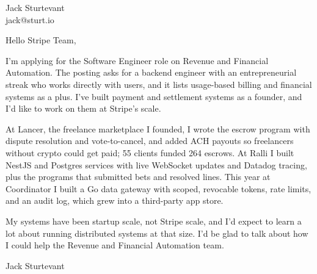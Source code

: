 \documentclass[11pt]{article}
\begin{document}
\raggedright

{\namefont\fontsize{20pt}{24pt}\selectfont Jack Sturtevant}\\[-0.3em]
jack@sturt.io

\vspace{1.2em}

Hello Stripe Team,

I'm applying for the Software Engineer role on Revenue and Financial Automation. The posting asks for a backend engineer with an entrepreneurial streak who works directly with users, and it lists usage-based billing and financial systems as a plus. I've built payment and settlement systems as a founder, and I'd like to work on them at Stripe's scale.

At Lancer, the freelance marketplace I founded, I wrote the escrow program with dispute resolution and vote-to-cancel, and added ACH payouts so freelancers without crypto could get paid; 55 clients funded 264 escrows. At Ralli I built NestJS and Postgres services with live WebSocket updates and Datadog tracing, plus the programs that submitted bets and resolved lines. This year at Coordinator I built a Go data gateway with scoped, revocable tokens, rate limits, and an audit log, which grew into a third-party app store.

My systems have been startup scale, not Stripe scale, and I'd expect to learn a lot about running distributed systems at that size. I'd be glad to talk about how I could help the Revenue and Financial Automation team.

\vspace{0.6em}
Jack Sturtevant
\end{document}
